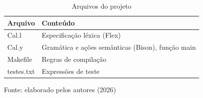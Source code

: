 \begin{table}[H]
\centering
\caption{\small Arquivos do projeto}
\begin{tabularx}{\textwidth}{l | X}
\hline
\textbf{Arquivo} & \textbf{Conteúdo} \\
\hline
Cal.l & Especificação léxica (Flex) \\
Cal.y & Gramática e ações semânticas (Bison), função main \\
Makefile & Regras de compilação \\
testes.txt & Expressões de teste \\
\hline
\end{tabularx}
\bigbreak
\small Fonte: elaborado pelos autores (2026)
\end{table}

\begin{longlisting}
    \label{codigo:makefile}
    \caption{Código fonte do Makefile para a calculadora}
    \inputminted{make}{Codigos/Makefile}
\end{longlisting}

\lipsum[3]

